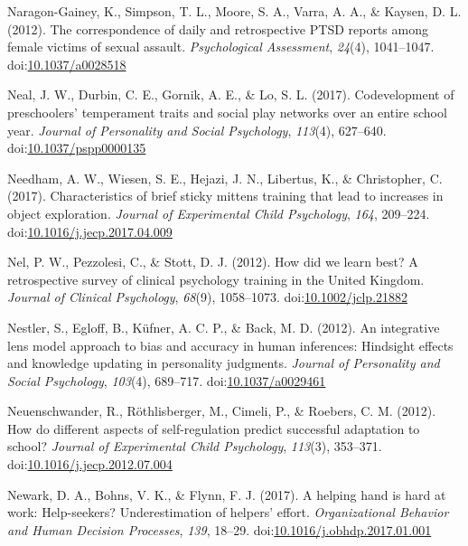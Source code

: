 \documentclass[english,man]{apa6}
\theoremstyle{definition}
\theoremstyle{definition}
\theoremstyle{definition}
\theoremstyle{remark}
\begin{document}
\hypertarget{ref-Naragon-Gainey2012}{}
Naragon-Gainey, K., Simpson, T. L., Moore, S. A., Varra, A. A., \&
Kaysen, D. L. (2012). The correspondence of daily and retrospective PTSD
reports among female victims of sexual assault. \emph{Psychological
Assessment}, \emph{24}(4), 1041--1047.
doi:\href{https://doi.org/10.1037/a0028518}{10.1037/a0028518}

\hypertarget{ref-Neal2017}{}
Neal, J. W., Durbin, C. E., Gornik, A. E., \& Lo, S. L. (2017).
Codevelopment of preschoolers' temperament traits and social play
networks over an entire school year. \emph{Journal of Personality and
Social Psychology}, \emph{113}(4), 627--640.
doi:\href{https://doi.org/10.1037/pspp0000135}{10.1037/pspp0000135}

\hypertarget{ref-Needham2017}{}
Needham, A. W., Wiesen, S. E., Hejazi, J. N., Libertus, K., \&
Christopher, C. (2017). Characteristics of brief sticky mittens training
that lead to increases in object exploration. \emph{Journal of
Experimental Child Psychology}, \emph{164}, 209--224.
doi:\href{https://doi.org/10.1016/j.jecp.2017.04.009}{10.1016/j.jecp.2017.04.009}

\hypertarget{ref-Nel2012}{}
Nel, P. W., Pezzolesi, C., \& Stott, D. J. (2012). How did we learn
best? A retrospective survey of clinical psychology training in the
United Kingdom. \emph{Journal of Clinical Psychology}, \emph{68}(9),
1058--1073.
doi:\href{https://doi.org/10.1002/jclp.21882}{10.1002/jclp.21882}

\hypertarget{ref-Nestler}{}
Nestler, S., Egloff, B., Küfner, A. C. P., \& Back, M. D. (2012). An
integrative lens model approach to bias and accuracy in human
inferences: Hindsight effects and knowledge updating in personality
judgments. \emph{Journal of Personality and Social Psychology},
\emph{103}(4), 689--717.
doi:\href{https://doi.org/10.1037/a0029461}{10.1037/a0029461}

\hypertarget{ref-Neuenschwander2012}{}
Neuenschwander, R., Röthlisberger, M., Cimeli, P., \& Roebers, C. M.
(2012). How do different aspects of self-regulation predict successful
adaptation to school? \emph{Journal of Experimental Child Psychology},
\emph{113}(3), 353--371.
doi:\href{https://doi.org/10.1016/j.jecp.2012.07.004}{10.1016/j.jecp.2012.07.004}

\hypertarget{ref-Newark2017}{}
Newark, D. A., Bohns, V. K., \& Flynn, F. J. (2017). A helping hand is
hard at work: Help-seekers? Underestimation of helpers' effort.
\emph{Organizational Behavior and Human Decision Processes}, \emph{139},
18--29.
doi:\href{https://doi.org/10.1016/j.obhdp.2017.01.001}{10.1016/j.obhdp.2017.01.001}
\end{document}
